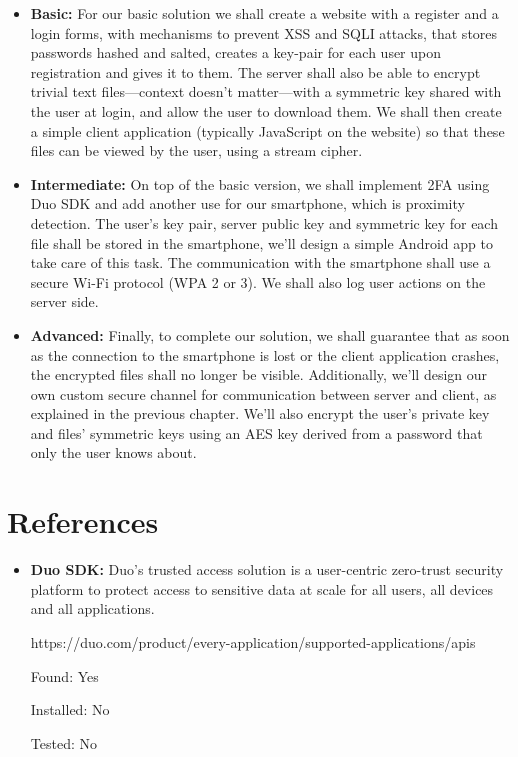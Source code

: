 \documentclass[12pt]{article}
\begin{document}
\begin{itemize}
  \item \textbf{Basic:} For our basic solution we shall create a website with a register and a login forms, with mechanisms to prevent XSS and SQLI attacks, that stores passwords hashed and salted, creates a key-pair for each user upon registration and gives it to them. The server shall also be able to encrypt trivial text files---context doesn't matter---with a symmetric key shared with the user at login, and allow the user to download them.  We shall then create a simple client application (typically JavaScript on the website) so that these files can be viewed by the user, using a stream cipher.

  \item \textbf{Intermediate:} On top of the basic version, we shall implement 2FA using Duo SDK and add another use for our smartphone, which is proximity detection. The user's key pair, server public key and symmetric key for each file shall be stored in the smartphone, we'll design a simple Android app to take care of this task. The communication with the smartphone shall use a secure Wi-Fi protocol (WPA 2 or 3). We shall also log user actions on the server side.

  \item \textbf{Advanced:} Finally, to complete our solution, we shall guarantee that as soon as the connection to the smartphone is lost or the client application crashes, the encrypted files shall no longer be visible. Additionally, we'll design our own custom secure channel for communication between server and client, as explained in the previous chapter. We'll also encrypt the user's private key and files' symmetric keys using an AES key derived from a password that only the user knows about.
\end{itemize}



\newpage
\section{References}

\begin{itemize}
  \item \textbf{Duo SDK:} Duo's trusted access solution is a user-centric zero-trust security platform to protect access to sensitive data at scale for all users, all devices and all applications.\par https://duo.com/product/every-application/supported-applications/apis\par
  Found: Yes\par
  Installed: No\par
  Tested: No\par
\end{itemize}
\end{document}
